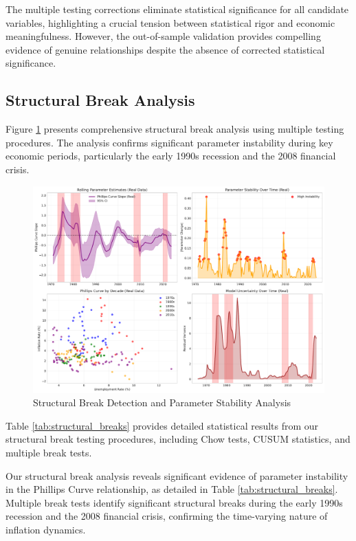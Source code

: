 \documentclass[12pt]{article}
\begin{document}
The multiple testing corrections eliminate statistical significance for all candidate variables, highlighting a crucial tension between statistical rigor and economic meaningfulness. However, the out-of-sample validation provides compelling evidence of genuine relationships despite the absence of corrected statistical significance.

\subsection{Structural Break Analysis}

Figure \ref{fig:structural_breaks} presents comprehensive structural break analysis using multiple testing procedures. The analysis confirms significant parameter instability during key economic periods, particularly the early 1990s recession and the 2008 financial crisis.

\begin{figure}[H]
\centering
\includegraphics[width=\textwidth]{../figures/structural_breaks.pdf}
\caption{Structural Break Detection and Parameter Stability Analysis}
\label{fig:structural_breaks}
\end{figure}

Table \ref{tab:structural_breaks} provides detailed statistical results from our structural break testing procedures, including Chow tests, CUSUM statistics, and multiple break tests.



Our structural break analysis reveals significant evidence of parameter instability in the Phillips Curve relationship, as detailed in Table \ref{tab:structural_breaks}. Multiple break tests identify significant structural breaks during the early 1990s recession and the 2008 financial crisis, confirming the time-varying nature of inflation dynamics.
\end{document}
